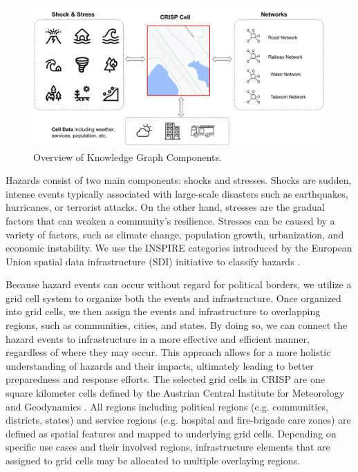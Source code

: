 \documentclass[
]{ceurart}
\begin{document}
\begin{figure}
  \label{overview}
  \centering
  \includegraphics[scale=0.25]{images/Crisp_Overview}
  \caption{Overview of Knowledge Graph Components.}
\end{figure}


Hazards consist of two main components: shocks and stresses. Shocks are sudden, intense events typically associated with large-scale disasters such as earthquakes, hurricanes, or terrorist attacks. On the other hand, stresses are the gradual factors that can weaken a community's resilience. Stresses can be caused by a variety of factors, such as climate change, population growth, urbanization, and economic instability. We use the INSPIRE categories introduced by the European Union spatial data infrastructure (SDI) initiative to classify hazards \cite{bartha2011standardization}. 

Because hazard events can occur without regard for political borders, we utilize a grid cell system to organize both the events and infrastructure. Once organized into grid cells, we then assign the events and infrastructure to overlapping regions, such as communities, cities, and states. By doing so, we can connect the hazard events to infrastructure in a more effective and efficient manner, regardless of where they may occur. This approach allows for a more holistic understanding of hazards and their impacts, ultimately leading to better preparedness and response efforts. The selected grid cells in CRISP are one square kilometer cells defined by the Austrian Central Institute for Meteorology and Geodynamics \cite{haiden2011integrated}. All regions including political regions (e.g. communities, districts, states) and service regions (e.g. hospital and fire-brigade care zones) are defined as spatial features and mapped to underlying grid cells. Depending on specific use cases and their involved regions, infrastructure elements that are assigned to grid cells may be allocated to multiple overlaying regions.
\end{document}
